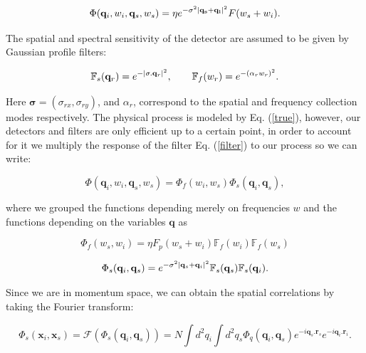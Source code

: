 \documentclass[12pt]{book}
\begin{document}
\begin{equation}
\Phi(\mathbf{q}_{i},w_{i},\mathbf{q}_{s},w_{s})= \eta e^{-\sigma^{2}\abs{\mathbf{q_{s}}+\mathbf{q_{i}}}^{2}} F(w_{s}+w_{i}).\label{true}
\end{equation}

The spatial and spectral sensitivity of the detector are assumed to be given by Gaussian profile filters:

\begin{equation}
\mathbb{F}_{s}(\mathbf{q}_{r})=e^{-\abs{\mathbf{\sigma}.\mathbf{q}_{r}}^{2}},\qquad \mathbb{F}_{f}(w_{r})=e^{-(\alpha_{r} w_{r})^{2}}. \label{filter}
\end{equation}


Here $\mathbf{\sigma}=(\sigma_{rx},\sigma_{ry})$, and $\alpha_{r}$, correspond to the spatial and frequency collection modes respectively. 
The physical process is modeled by Eq. (\ref{true}), however, our detectors and filters are only efficient up to a certain point, in order to account for it we multiply the response of the filter Eq. (\ref{filter}) to our process so we can write:
 


\begin{equation}
\Phi(\mathbf{q}_{i},w_{i},\mathbf{q}_{s},w_{s})=\Phi_{f}(w_{i},w_{s})\Phi_{s}(\mathbf{q}_{i},\mathbf{q}_{s}),
\end{equation}

where we grouped the functions depending merely on frequencies $w$  and the functions depending on the variables $\mathbf{q}$ as

\begin{equation}
\Phi_{f}(w_{s},w_{i})= \eta F_{p}(w_{s}+w_{i}) \mathbb{F}_{f}(w_{i})\mathbb{F}_{f}(w_{s})
\end{equation}

\begin{equation}
 \Phi_{s}(\mathbf{q}_{i},\mathbf{q}_{s})=e^{-\sigma^{2}\abs{\mathbf{q}_{s}+\mathbf{q}_{i}}^{2}}\mathbb{F}_{s}(\mathbf{q}_{s})\mathbb{F}_{s}(\mathbf{q}_{i}).
\end{equation}

Since we are in momentum space, we can obtain the spatial correlations by taking the Fourier transform:

\begin{equation}
\Phi_{s}(\mathbf{x}_{i},\mathbf{x}_{s})=\mathscr{F}(\Phi_{s}(\mathbf{q}_{i},\mathbf{q}_{s}))=N \int d^{2}q_{i} \int d^{2}q_{s} \Phi_{q}(\mathbf{q}_{i},\mathbf{q}_{s}) e^{-i \mathbf{q}_{s}.\mathbf{r}_{s}} e^{-i \mathbf{q}_{i}.\mathbf{r}_{i}}.
\end{equation}
\end{document}
